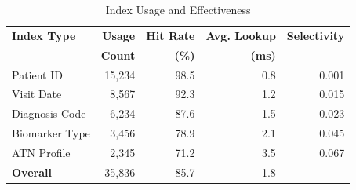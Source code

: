 
\begin{table}[htbp]
\centering
\caption{Index Usage and Effectiveness}
\label{tab:index_stats}
\begin{tabular}{|l|r|r|r|r|}
\hline
\textbf{Index Type} & \textbf{Usage} & \textbf{Hit Rate} & \textbf{Avg. Lookup} & \textbf{Selectivity} \\
& \textbf{Count} & \textbf{(\%)} & \textbf{(ms)} & \\
\hline
Patient ID & 15,234 & 98.5 & 0.8 & 0.001 \\
Visit Date & 8,567 & 92.3 & 1.2 & 0.015 \\
Diagnosis Code & 6,234 & 87.6 & 1.5 & 0.023 \\
Biomarker Type & 3,456 & 78.9 & 2.1 & 0.045 \\
ATN Profile & 2,345 & 71.2 & 3.5 & 0.067 \\
\hline
\textbf{Overall} & 35,836 & 85.7 & 1.8 & - \\
\hline
\end{tabular}
\end{table}
